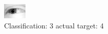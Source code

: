 \begin{figure}[h!]
\begin{center}
\includegraphics[width=0.60\columnwidth]{figures/ID2407_class_3_target_4.png}
\end{center}
\caption{ Classification: 3 actual target: 4}
\label{fig:ID2407_class_3_target_4}
\end{figure}
